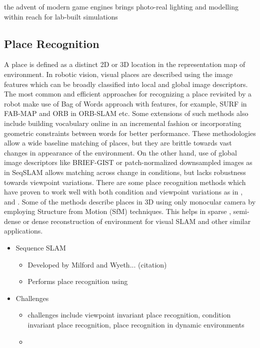 the advent of modern game engines brings photo-real lighting and modelling within reach for lab-built simulations

\subsection{Place Recognition}
A place is defined as a distinct 2D or 3D location in the representation map of environment. In robotic vision, visual places are described using the image features which can be broadly classified into local and global image descriptors. The most common and efficient approaches for recognizing a place revisited by a robot make use of Bag of Words approach with features, for example, SURF in FAB-MAP \cite{Cummins2010} and ORB in ORB-SLAM \cite{Montiel2015} etc. Some extensions of such methods also include building vocabulary online in an incremental fashion or incorporating geometric constraints between words for better performance. These methodologies allow a wide baseline matching of places, but they are brittle towards vast changes in appearance of the environment. On the other hand, use of global image descriptors like BRIEF-GIST \cite{Sunderhauf2011} or patch-normalized downsampled images as in SeqSLAM \cite{Milford2012} allows matching across change in conditions, but lacks robustness towards viewpoint variations. There are some place recognition methods which have proven to work well with both condition and viewpoint variations as in \cite{McManus2014}, \cite{Milford2008} and \cite{Niko2015}. Some of the methods describe places in 3D using only monocular camera by employing Structure from Motion (SfM) techniques. This helps in sparse \cite{Montiel2015}, semi-dense \cite{Engel2014lsd, Mur-Artal2015b} or dense \cite{Newcombe2011} reconstruction of environment for visual SLAM and other similar applications.
 
\begin{itemize}
    \item Sequence SLAM
    \begin{itemize}
        \item Developed by Milford and Wyeth... (citation)
        \item Performs place recognition using 
    \end{itemize}
    \item {Challenges}
        \begin{itemize}
            \item challenges include viewpoint invariant place recognition, condition invariant place recognition, place recognition in dynamic environments
            \item 
        \end{itemize}
\end{itemize}